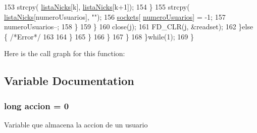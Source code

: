 \begin{DoxyCode}
153                                                                         strcpy(
      \hyperlink{_g-2361-06-_p1-_server_8c_a713172366a6be2fbf8456a4b43702603}{listaNicks}[k], \hyperlink{_g-2361-06-_p1-_server_8c_a713172366a6be2fbf8456a4b43702603}{listaNicks}[k+1]);
154                                                                 \}
155                                                                 strcpy(
      \hyperlink{_g-2361-06-_p1-_server_8c_a713172366a6be2fbf8456a4b43702603}{listaNicks}[numeroUsuarios], \textcolor{stringliteral}{""});
156                                                                 \hyperlink{_g-2361-06-_p1-_server_8c_a7724e53f22e431d1ecb6516951a172e1}{sockets}[
      \hyperlink{_g-2361-06-_p1-_server_8c_ac9a5ec6f534d2a8e2a870179807d32dc}{numeroUsuarios}] = -1;
157                                                                 numeroUsuarios--;
158                                                         \}
159                                                 \}
160                                                 close(j);
161                                 FD\_CLR(j, &readset);
162                             \}\textcolor{keywordflow}{else} \{ \textcolor{comment}{/*Error*/}
163 
164                             \}
165                         \}      
166                 \}     
167                 \}
168         \}\textcolor{keywordflow}{while}(1);
169 \}
\end{DoxyCode}


Here is the call graph for this function\+:




\subsection{Variable Documentation}
\subsubsection[{\texorpdfstring{accion}{accion}}]{\setlength{\rightskip}{0pt plus 5cm}long accion = 0}\hypertarget{_g-2361-06-_p1-_server_8c_a93e785c991445d8b8ee99c2e51242d5a}{}\label{_g-2361-06-_p1-_server_8c_a93e785c991445d8b8ee99c2e51242d5a}
Variable que almacena la accion de un usuario 
